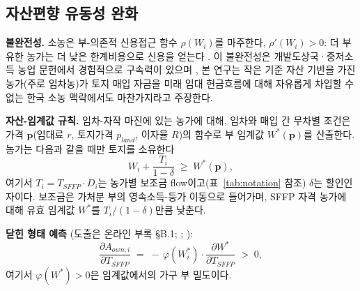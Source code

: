 \documentclass[12pt, a4paper]{article}
\begin{document}
\subsection{자산편향 유동성 완화}
\label{sec:liquidity}

\textbf{불완전성.} 소농은 부-의존적 신용접근 함수 $\rho(W_i)$를 마주한다, $\rho'(W_i) > 0$: 더 부유한 농가는 더 낮은 한계비용으로 신용을 얻는다 \citep{CarterOlinto2003_liquidity}. 이 불완전성은 개발도상국·중저소득 농업 문헌에서 경험적으로 구속력이 있으며 \citep{PittKhandker1998_credit, FosterRosenzweig1995_learning}, 본 연구는 작은 기준 자산 기반을 가진 농가(주로 임차농)가 토지 매입 자금을 미래 임대 현금흐름에 대해 자유롭게 차입할 수 없는 한국 소농 맥락에서도 마찬가지라고 주장한다.

\textbf{자산-임계값 규칙.} 임차-자작 마진에 있는 농가에 대해, 임차와 매입 간 무차별 조건은 가격 $\mathbf{p}$(임대료 $r$, 토지가격 $p_{land}$, 이자율 $R$)의 함수로 부 임계값 $W^*(\mathbf{p})$를 산출한다. 농가는 다음과 같을 때만 토지를 소유한다
\begin{equation}
W_i + \frac{T_i}{1-\delta} \;\ge\; W^*(\mathbf{p}),
\label{eq:CO-threshold}
\end{equation}
여기서 $T_i = T_{SFFP} \cdot D_i$는 농가별 보조금 flow이고(표~\ref{tab:notation} 참조) $\delta$는 할인인자이다. 보조금은 가처분 부의 영속소득-등가 이동으로 들어가며, SFFP 자격 농가에 대해 유효 임계값 $W^*$를 $T_i/(1-\delta)$만큼 낮춘다.

\textbf{닫힌 형태 예측} (도출은 온라인 부록 \S B.1; \citealp{CarterOlinto2003_liquidity}; \citealp{Kazukauskas2013_disinvestment}):
\begin{equation}
\boxed{\frac{\partial A_{own,i}}{\partial T_{SFFP}} \;=\; -\,\varphi(W_i^*) \cdot \frac{\partial W^*}{\partial T_{SFFP}} \;>\; 0,}
\label{eq:CO-1}
\end{equation}
여기서 $\varphi(W^*) > 0$은 임계값에서의 가구 부 밀도이다.
\end{document}
